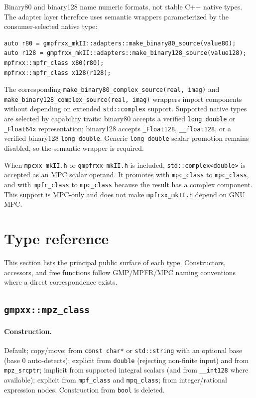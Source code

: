 \documentclass[11pt,a4paper]{article}
\newcommand{\code}[1]{\lstinline!#1!}
\begin{document}
Binary80 and binary128 name numeric formats, not stable C++ native types.
The adapter layer therefore uses semantic wrappers parameterized by the
consumer-selected native type:

\begin{lstlisting}
auto r80 = gmpfrxx_mkII::adapters::make_binary80_source(value80);
auto r128 = gmpfrxx_mkII::adapters::make_binary128_source(value128);
mpfrxx::mpfr_class x80(r80);
mpfrxx::mpfr_class x128(r128);
\end{lstlisting}

The corresponding \code{make_binary80_complex_source(real, imag)} and
\code{make_binary128_complex_source(real, imag)} wrappers import components
without depending on extended \code{std::complex} support.  Supported native
types are selected by capability traits: binary80 accepts a verified
\code{long double} or \code{_Float64x} representation; binary128 accepts
\code{_Float128}, \code{__float128}, or a verified binary128
\code{long double}.  Generic \code{long double} scalar promotion remains
disabled, so the semantic wrapper is required.

When \code{mpcxx_mkII.h} or \code{gmpfrxx_mkII.h} is included,
\code{std::complex<double>} is accepted as an MPC scalar operand. It promotes
with \code{mpc_class} to \code{mpc_class}, and with \code{mpfr_class} to
\code{mpc_class} because the result has a complex component. This support is
MPC-only and does not make \code{mpfrxx_mkII.h} depend on GNU MPC.

\section{Type reference}

This section lists the principal public surface of each type. Constructors,
accessors, and free functions follow GMP/MPFR/MPC naming conventions where a
direct correspondence exists.

\subsection{\code{gmpxx::mpz_class}}

\paragraph{Construction.} Default; copy/move; from \code{const char*} or
\code{std::string} with an optional base (base 0 auto-detects); explicit from
\code{double} (rejecting non-finite input) and from \code{mpz_srcptr}; implicit
from supported integral scalars (and from \code{__int128} where available);
explicit from \code{mpf_class} and \code{mpq_class}; from integer/rational
expression nodes. Construction from \code{bool} is deleted.
\end{document}
